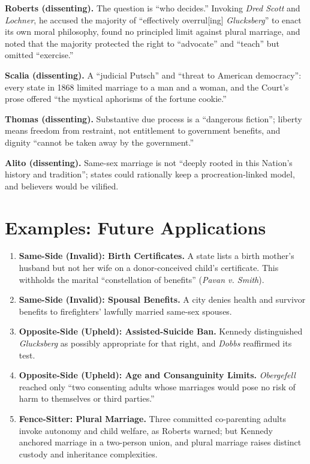 \documentclass[12pt]{article}
\begin{document}
\textbf{Roberts (dissenting).} The question is ``who decides.'' Invoking \textit{Dred Scott} and \textit{Lochner}, he accused the majority of ``effectively overrul[ing] \textit{Glucksberg}'' to enact its own moral philosophy, found no principled limit against plural marriage, and noted that the majority protected the right to ``advocate'' and ``teach'' but omitted ``exercise.''

\textbf{Scalia (dissenting).} A ``judicial Putsch'' and ``threat to American democracy'': every state in 1868 limited marriage to a man and a woman, and the Court's prose offered ``the mystical aphorisms of the fortune cookie.''

\textbf{Thomas (dissenting).} Substantive due process is a ``dangerous fiction''; liberty means freedom from restraint, not entitlement to government benefits, and dignity ``cannot be taken away by the government.''

\textbf{Alito (dissenting).} Same-sex marriage is not ``deeply rooted in this Nation's history and tradition''; states could rationally keep a procreation-linked model, and believers would be vilified.

\section{Examples: Future Applications}

\begin{enumerate}
\item \textbf{Same-Side (Invalid): Birth Certificates.} A state lists a birth mother's husband but not her wife on a donor-conceived child's certificate. This withholds the marital ``constellation of benefits'' (\textit{Pavan v. Smith}).
\item \textbf{Same-Side (Invalid): Spousal Benefits.} A city denies health and survivor benefits to firefighters' lawfully married same-sex spouses.
\item \textbf{Opposite-Side (Upheld): Assisted-Suicide Ban.} Kennedy distinguished \textit{Glucksberg} as possibly appropriate for that right, and \textit{Dobbs} reaffirmed its test.
\item \textbf{Opposite-Side (Upheld): Age and Consanguinity Limits.} \textit{Obergefell} reached only ``two consenting adults whose marriages would pose no risk of harm to themselves or third parties.''
\item \textbf{Fence-Sitter: Plural Marriage.} Three committed co-parenting adults invoke autonomy and child welfare, as Roberts warned; but Kennedy anchored marriage in a two-person union, and plural marriage raises distinct custody and inheritance complexities.
\end{enumerate}
\end{document}
